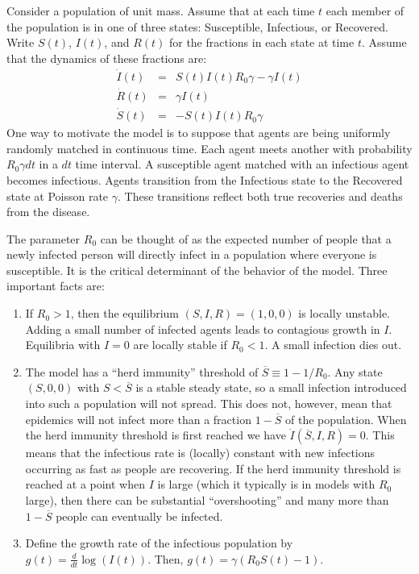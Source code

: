 \documentclass[11pt]{article}
\begin{document}
Consider a population of unit mass. Assume that at each time $t$ each member of the population is in one of three states: 
Susceptible, Infectious, or Recovered. Write $S(t)$, $I(t)$, and $R(t)$ for the fractions in each state at time $t$. Assume that the
dynamics of these fractions are:
\begin{eqnarray*}
\dot{I}(t)  & = & S(t) I(t) R_0 \gamma - \gamma I(t) \\
\dot{R}(t) & = & \gamma I(t) \\
\dot{S}(t) & = & -S(t) I(t) R_0 \gamma 
\end{eqnarray*} 
One way to motivate the model is to suppose that agents are being uniformly randomly matched in continuous time. Each agent 
meets another with probability $R_0 \gamma dt$ in a $dt$ time interval. A susceptible agent matched with an infectious agent 
becomes infectious. Agents transition from the Infectious state to the Recovered state at Poisson rate $\gamma$. These 
transitions reflect both true recoveries and deaths from the disease.

The parameter $R_0$ can be thought of as the expected number of people that a newly infected person will directly infect in a 
population where everyone is susceptible. It is the critical determinant of the behavior of the model. Three important facts are:

\begin{enumerate}
\item
If $R_0 >1$, then the equilibrium $(S, I, R) = (1, 0, 0)$ is locally unstable. Adding a small number of infected agents leads to 
contagious growth in $I$. Equilibria with $I=0$ are locally stable if $R_0 < 1$. A small infection dies out.

\item
The model has a ``herd immunity'' threshold of $\overline{S} \equiv 1 - 1/R_0$. Any state $(S, 0, 0)$ with $S < \overline{S}$ is a stable 
steady state, so a small infection introduced into such a population will not spread. This does not, however, mean 
that epidemics will not infect more than a fraction $1-\overline{S}$ of the population. When the herd immunity threshold is first reached we 
have $\dot{I}(\overline{S}, I, R) = 0.$ This means that the infectious rate is (locally) constant with new
infections occurring as fast as people are recovering. If the herd immunity threshold is reached at a point when $I$ is large 
(which it typically is in models with $R_0$ large), then there can be substantial ``overshooting'' and many more than 
$1-\overline{S}$ people can eventually be infected.

\item
Define the growth rate of the infectious population by $g(t) = \frac{d}{dt} \log(I(t))$. Then, $g(t) = \gamma (R_0 S(t) - 1)$.
\end{enumerate}
\end{document}
